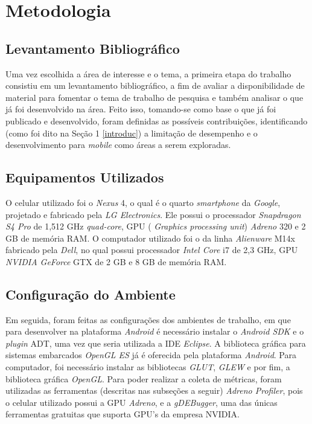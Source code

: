 \chapter[Metodologia]{Metodologia}

\section{Levantamento Bibliográfico}

Uma vez escolhida a área de interesse e o tema, a primeira etapa do trabalho consistiu em um levantamento bibliográfico, a fim de avaliar a disponibilidade de material para fomentar o tema de trabalho de pesquisa e também analisar o que já foi desenvolvido na área. Feito isso, tomando-se como base o que já foi publicado e desenvolvido, foram definidas as possíveis contribuições, identificando (como foi dito na Seção 1 \ref{introduc}) a limitação de desempenho e o desenvolvimento para \textit{mobile} como áreas a serem exploradas.  

\section{Equipamentos Utilizados}

O celular utilizado foi o \textit{Nexus} 4, o qual é o quarto  \textit{smartphone} da  \textit{Google}, projetado e fabricado pela \textit{LG Electronics}.  Ele possui o processador \textit{Snapdragon S4 Pro} de 1,512 GHz \textit{quad-core}, GPU ( \textit{Graphics processing unit}) \textit{Adreno} 320 e 2 GB de memória RAM. O computador utilizado foi o da linha \textit{Alienware} M14x fabricado pela \textit{Dell}, no qual possui processador \textit{Intel Core} i7 de 2,3 GHz, GPU \textit{NVIDIA GeForce} GTX de 2 GB e 8 GB de memória RAM. 

\section{Configuração do Ambiente}
\label{configamb}	

Em seguida, foram feitas as configurações dos ambientes de trabalho, em que  para desenvolver na plataforma \textit{Android} é necessário instalar o \textit{Android SDK} e o \textit{plugin} ADT, uma vez que seria utilizada a IDE \textit{Eclipse}. A biblioteca gráfica para sistemas embarcados \textit{OpenGL ES} já é oferecida pela plataforma \textit{Android}. Para computador, foi necessário instalar as bibliotecas \textit{GLUT}, \textit{GLEW} e por fim, a biblioteca gráfica \textit{OpenGL}. Para poder realizar a coleta de métricas, foram utilizadas as ferramentas (descritas nas subseções a seguir) \textit{Adreno Profiler}, pois o celular utilizado possui a GPU \textit{Adreno}, e a \textit{gDEBugger}, uma das únicas ferramentas gratuitas que suporta GPU's da empresa NVIDIA.

